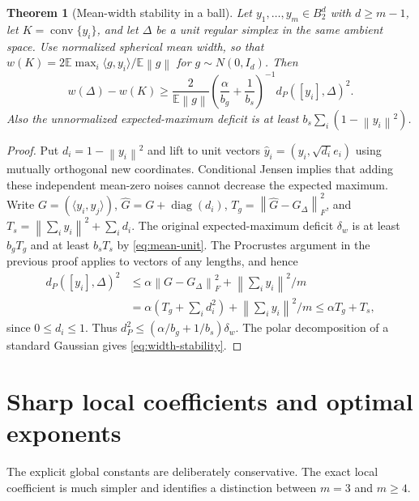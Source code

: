 \documentclass[11pt]{article}
\newtheorem{theorem}{Theorem}
\theoremstyle{remark}\newtheorem{remark}[theorem]{Remark}
\newcommand{\E}{\mathbb E}
\newcommand{\diag}{\operatorname{diag}}
\newcommand{\norm}[1]{\left\lVert#1\right\rVert}
\begin{document}
\begin{theorem}[Mean-width stability in a ball]\label{thm:width}
Let $y_1,\ldots,y_m\in B_2^d$ with $d\ge m-1$, let
$K=\operatorname{conv}\{y_i\}$, and let $\Delta$ be a unit regular simplex
in the same ambient space. Use normalized spherical mean width, so that
$w(K)=2\E\max_i\langle g,y_i\rangle/\E\norm g$ for $g\sim N(0,I_d)$.
Then
\begin{equation}\label{eq:width-stability}
 w(\Delta)-w(K)
 \ge \frac{2}{\E\norm g}
          \left(\frac\alpha{b_g}+\frac1{b_s}\right)^{-1}
          d_P([y_i],\Delta)^2.
\end{equation}
Also the unnormalized expected-maximum deficit is at least
$b_s\sum_i(1-\norm{y_i}^2)$.
\end{theorem}
\begin{proof}
Put $d_i=1-\norm{y_i}^2$ and lift to unit vectors
$\widehat y_i=(y_i,\sqrt{d_i}e_i)$ using mutually orthogonal new coordinates.
Conditional Jensen implies that adding these independent mean-zero noises
cannot decrease the expected maximum. Write $G=(\langle y_i,y_j\rangle)$,
$\widehat G=G+\diag(d_i)$,
$T_g=\norm{\widehat G-G_\Delta}_F^2$, and
$T_s=\norm{\sum_i y_i}^2+\sum_i d_i$.
The original expected-maximum deficit $\delta_w$ is at least $b_gT_g$ and
at least $b_sT_s$ by \eqref{eq:mean-unit}. The Procrustes argument in the
previous proof applies to vectors of any lengths, and hence
\begin{align*}
 d_P([y_i],\Delta)^2
 &\le\alpha\norm{G-G_\Delta}_F^2+\norm{\textstyle\sum_i y_i}^2/m\\
 &=\alpha\left(T_g+\sum_i d_i^2\right)+\norm{\textstyle\sum_i y_i}^2/m
 \le\alpha T_g+T_s,
\end{align*}
since $0\le d_i\le1$. Thus
$d_P^2\le(\alpha/b_g+1/b_s)\delta_w$.
The polar decomposition of a standard Gaussian gives \eqref{eq:width-stability}.
\end{proof}

\section{Sharp local coefficients and optimal exponents}
The explicit global constants are deliberately conservative. The exact local
coefficient is much simpler and identifies a distinction between $m=3$ and
$m\ge4$.
\end{document}

